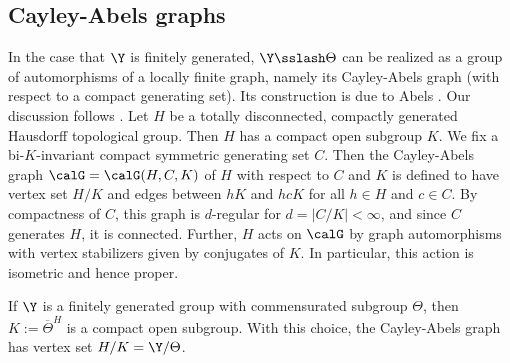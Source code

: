 \subsection{Cayley-Abels graphs}\label{sec:ca-graphs}
In the case that $\Y$ is finitely generated, $\Y\sslash\Theta$ can be realized as a group of automorphisms of a locally finite graph, namely its Cayley-Abels graph (with respect to a compact generating set). Its construction is due to Abels \cite{abels-cayley}. Our discussion follows \cite[11.3]{monod-book}. Let $H$ be a totally disconnected, compactly generated Hausdorff topological group. Then $H$ has a compact open subgroup $K$. We fix a bi-$K$-invariant compact symmetric generating set $C$. Then the Cayley-Abels graph $\calG=\calG(H,C, K)$ of $H$ with respect to $C$ and $K$ is defined to have vertex set $H/K$ and edges between $hK$ and $hcK$ for all $h\in H$ and $c\in C$. By compactness of $C$, this graph is $d$-regular for $d=|C/K|<\infty$, and since $C$ generates $H$, it is connected. Further, $H$ acts on $\calG$ by graph automorphisms with vertex stabilizers given by conjugates of $K$. In particular, this action is isometric and hence proper.

If $\Y$ is a finitely generated group with commensurated subgroup $\Theta$, then $K:=\overline{\Theta}^H$ is a compact open subgroup. With this choice, the Cayley-Abels graph has vertex set $H/K=\Y/\Theta$.

